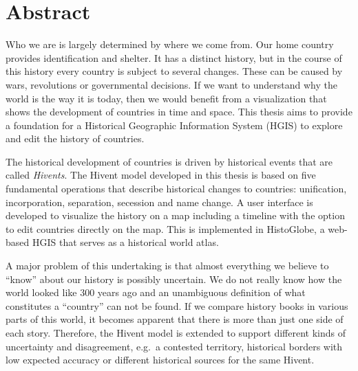 
\chapter*{Abstract} %
\label{cha:abstract}

Who we are is largely determined by where we come from. Our home country provides identification and shelter. It has a distinct history, but in the course of this history every country is subject to several changes. These can be caused by wars, revolutions or governmental decisions. If we want to understand why the world is the way it is today, then we would benefit from a visualization that shows the development of countries in time and space. This thesis aims to provide a foundation for a Historical Geographic Information System (HGIS) to explore and edit the history of countries.

The historical development of countries is driven by historical events that are called \emph{Hivents}. The Hivent model developed in this thesis is based on five fundamental operations that describe historical changes to countries: unification, incorporation, separation, secession and name change. A user interface is developed to visualize the history on a map including a timeline with the option to edit countries directly on the map. This is implemented in HistoGlobe, a web-based HGIS that serves as a historical world atlas.

A major problem of this undertaking is that almost everything we believe to ``know'' about our history is possibly uncertain. We do not really know how the world looked like 300 years ago and an unambiguous definition of what constitutes a ``country'' can not be found. If we compare history books in various parts of this world, it becomes apparent that there is more than just one side of each story. Therefore, the Hivent model is extended to support different kinds of uncertainty and disagreement, e.g.\ a contested territory, historical borders with low expected accuracy or different historical sources for the same Hivent.


